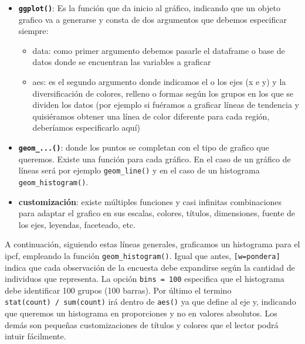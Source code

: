 \documentclass[
]{book}
\providecommand{\tightlist}{%
  \setlength{\itemsep}{0pt}\setlength{\parskip}{0pt}}
\begin{document}
\begin{itemize}
\tightlist
\item
  \textbf{\texttt{ggplot()}}: Es la función que da inicio al gráfico, indicando que un objeto grafico va a generarse y consta de dos argumentos que debemos especificar siempre:

  \begin{itemize}
  \tightlist
  \item
    data: como primer argumento debemos pasarle el dataframe o base de datos donde se encuentran las variables a graficar
  \item
    aes: es el segundo argumento donde indicamos el o los ejes (x e y) y la diversificación de colores, relleno o formas según los grupos en los que se dividen los datos (por ejemplo si fuéramos a graficar líneas de tendencia y quisiéramos obtener una línea de color diferente para cada región, deberíamos especificarlo aquí)
  \end{itemize}
\item
  \textbf{\texttt{geom\_...()}}: donde los puntos se completan con el tipo de grafico que queremos. Existe una función para cada gráfico. En el caso de un gráfico de líneas será por ejemplo \texttt{geom\_line()} y en el caso de un histograma \texttt{geom\_histogram()}.
\item
  \textbf{customización}: existe múltiples funciones y casi infinitas combinaciones para adaptar el grafico en sus escalas, colores, títulos, dimensiones, fuente de los ejes, leyendas, faceteado, etc.
\end{itemize}

A continuación, siguiendo estas líneas generales, graficamos un histograma para el ipcf, empleando la función \texttt{geom\_histogram()}. Igual que antes, \texttt{{[}w=pondera{]}} indica que cada observación de la encuesta debe expandirse según la cantidad de individuos que representa. La opción \texttt{bins\ =\ 100} especifica que el histograma debe identificar 100 grupos (100 barras). Por último el termino \texttt{stat(count)\ /\ sum(count)} irá dentro de \texttt{aes()} ya que define al eje y, indicando que queremos un histograma en proporciones y no en valores absolutos. Los demás son pequeñas customizaciones de títulos y colores que el lector podrá intuir fácilmente.
\end{document}
